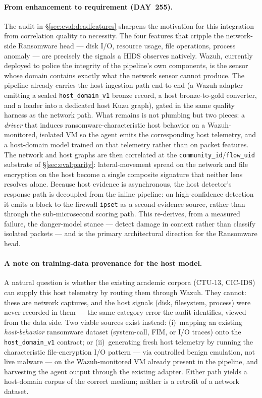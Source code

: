 \paragraph{From enhancement to requirement (DAY~255).}
The audit in \S\ref{sec:eval:deadfeatures} sharpens the motivation for this
integration from correlation quality to necessity. The four features that cripple
the network-side Ransomware head --- disk I/O, resource usage, file operations,
process anomaly --- are precisely the signals a HIDS observes natively. Wazuh,
currently deployed to police the integrity of the pipeline's own components, is
the sensor whose domain contains exactly what the network sensor cannot produce.
The pipeline already carries the host ingestion path end-to-end (a Wazuh adapter
emitting a sealed \texttt{host\_domain\_v1} bronze record, a host bronze-to-gold
converter, and a loader into a dedicated host Kuzu graph), gated in the same
quality harness as the network path. What remains is not plumbing but two pieces:
a \emph{driver} that induces ransomware-characteristic host behavior on a
Wazuh-monitored, isolated VM so the agent emits the corresponding host telemetry,
and a host-domain model trained on that telemetry rather than on packet features.
The network and host graphs are then correlated at the
\texttt{community\_id}/\texttt{flow\_uid} substrate of \S\ref{sec:eval:parity}:
lateral-movement spread on the network and file encryption on the host become a
single composite signature that neither lens resolves alone. Because host
evidence is asynchronous, the host detector's response path is decoupled from the
inline pipeline: on high-confidence detection it emits a block to the firewall
\texttt{ipset} as a second evidence source, rather than through the
sub-microsecond scoring path. This re-derives, from a measured failure, the
danger-model stance --- detect damage in context rather than classify isolated
packets --- and is the primary architectural direction for the Ransomware head.

\paragraph{A note on training-data provenance for the host model.}
A natural question is whether the existing academic corpora (CTU-13, CIC-IDS) can
supply this host telemetry by routing them through Wazuh. They cannot: these are
network captures, and the host signals (disk, filesystem, process) were never
recorded in them --- the same category error the audit identifies, viewed from
the data side. Two viable sources exist instead: (i)~mapping an existing
\emph{host-behavior} ransomware dataset (system-call, FIM, or I/O traces) onto the
\texttt{host\_domain\_v1} contract; or (ii)~generating fresh host telemetry by
running the characteristic file-encryption I/O pattern --- via controlled benign
emulation, not live malware --- on the Wazuh-monitored VM already present in the
pipeline, and harvesting the agent output through the existing adapter. Either
path yields a host-domain corpus of the correct medium; neither is a retrofit of
a network dataset.